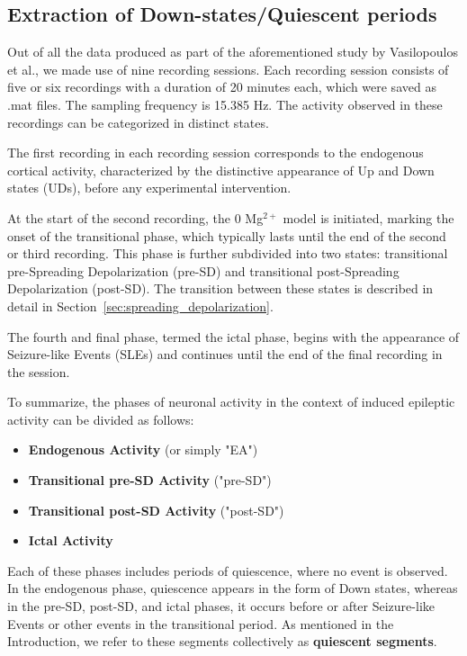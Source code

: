 \documentclass{article}
\begin{document}
\subsection{Extraction of Down-states/Quiescent periods}
Out of all the data produced as part of the aforementioned study by Vasilopoulos et al., we made use of nine recording sessions. Each recording session consists of five or six recordings with a duration of 20 minutes each, which were saved as .mat files. The sampling frequency is 15.385 Hz. The activity observed in these recordings can be categorized in distinct states. 

The first recording in each recording session corresponds to the endogenous cortical activity, characterized by the distinctive appearance of Up and Down states (UDs), before any experimental intervention. 

At the start of the second recording, the 0 Mg$^{2+}$ model is initiated, marking the onset of the transitional phase, which typically lasts until the end of the second or third recording. This phase is further subdivided into two states: transitional pre-Spreading Depolarization (pre-SD) and transitional post-Spreading Depolarization (post-SD). The transition between these states is described in detail  in Section~\ref{sec:spreading_depolarization}.

The fourth and final phase, termed the ictal phase, begins with the appearance of Seizure-like Events (SLEs) and continues until the end of the final recording in the session. 

To summarize, the phases of neuronal activity in the context of induced epileptic activity can be divided as follows:
\begin{itemize}
    \item \textbf{Endogenous Activity} (or simply "EA")
    \item \textbf{Transitional pre-SD Activity} ("pre-SD")
    \item \textbf{Transitional post-SD Activity} ("post-SD")
    \item \textbf{Ictal Activity} 
\end{itemize}
Each of these phases includes periods of quiescence, where no event is observed. In the endogenous phase, quiescence appears in the form of Down states, whereas in the pre-SD, post-SD, and ictal phases, it occurs before or after Seizure-like Events or other events in the transitional period. As mentioned in the Introduction, we refer to these segments collectively as \textbf{quiescent segments}. 
\end{document}
